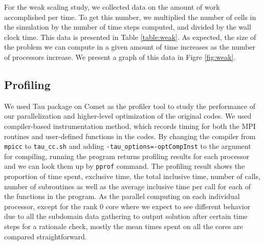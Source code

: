 \documentclass{article}
\begin{document}
For the weak scaling study, we collected data on the amount of work
accomplished per time. To get this number, we multiplied the number of
cells in the simulation by the number of time steps computed, and divided
by the wall clock time. This data is presented in Table \ref{table:weak}.
As expected, the size of the problem we can compute in a given amount of
time increases as the number of processors increase. We present a graph of
this data in Figre \ref{fig:weak}.

\subsection{Profiling}

We used Tau package on Comet as the profiler tool to study the performance of our parallelization and higher-level optimization of the original codes. We used compiler-based instrumentation method, which records timing for both the MPI routines and user-defined functions in the codes. By changing the compiler from \texttt{mpicc} to \texttt{tau\_cc.sh} and adding \texttt{-tau\_options=-optCompInst} to the argument for compiling, running the program returns profiling results for each processor and we can look them up by \texttt{pprof} command. The profiling result shows the proportion of time spent, exclusive time, the total inclusive time, number of calls, number of subroutines as well as the average inclusive time per call for each of the functions in the program. As the parallel computing on each individual processor, except for the rank $0$ core where we expect to see different behavior due to all the subdomain data gathering to output solution after certain time steps for a rationale check, mostly the mean times spent on all the cores are compared straightforward. 
\end{document}
